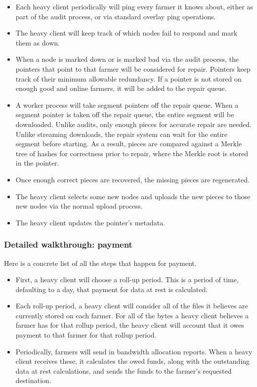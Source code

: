 \documentclass[a4paper,10pt]{article} \usepackage[utf8]{inputenc}
\begin{document}
\begin{itemize}
\item Each heavy client periodically will ping every farmer it knows about,
  either as part of the audit process, or via standard overlay ping operations.
\item The heavy client will keep track of which nodes fail to respond and mark
  them as down.
\item When a node is marked down or is marked bad via the audit process, the
  pointers that point to that farmer will be considered for repair. Pointers
  keep track of their minimum allowable redundancy. If a pointer is not stored
  on enough good and online farmers, it will be added to the repair queue.
\item A worker process will take segment pointers off the repair queue. When
  a segment pointer is taken off the repair queue, the entire segment will be
  downloaded. Unlike audits, only enough pieces for accurate repair are needed.
  Unlike streaming downloads, the repair system can wait for the entire segment
  before starting. As a result, pieces are compared against a Merkle tree of
  hashes for correctness prior to repair, where the Merkle root is stored in
  the pointer.
\item Once enough correct pieces are recovered, the missing pieces are
  regenerated.
\item The heavy client selects some new nodes and uploads the new pieces to
  those new nodes via the normal upload process.
\item The heavy client updates the pointer's metadata.
\end{itemize}

\subsubsection{Detailed walkthrough: payment}

Here is a concrete list of all the steps that happen for payment.

\begin{itemize}
\item First, a heavy client will choose a roll-up period. This is a period of
  time, defaulting to a day, that payment for data at rest is calculated.
\item Each roll-up period, a heavy client will consider all of the files it
  believes are currently stored on each farmer. For all of the bytes a heavy
  client believes a farmer has for that rollup period, the heavy client will
  account that it owes payment to that farmer for that rollup period.
\item Periodically, farmers will send in bandwidth allocation reports. When a
  heavy client receives these, it calculates the owed funds, along with the
  outstanding data at rest calculations, and sends the funds to the farmer's
  requested destination.
\end{itemize}
\end{document}
